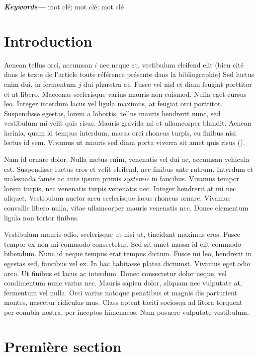 \documentclass[a4paper]{article}
\providecommand{\keywords}[1]
{
  \small	
  \textbf{\textit{Keywords---}} #1
}
\begin{document}
\keywords{mot clé; mot clé; mot clé}

\clearpage

\section{Introduction}

Aenean tellus orci, accumsan $i$ nec neque at, vestibulum eleifend elit \cite{helbing09,SchadCA09} ({\color{blue}bien cité dans le texte de l'article toute référence présente dans la bibliographie}) Sed luctus enim dui, in fermentum $j$ dui pharetra at. Fusce vel nisl et diam feugiat porttitor et at libero. Maecenas scelerisque varius mauris non euismod. Nulla eget cursus leo. Integer interdum lacus vel ligula maximus, at feugiat orci porttitor. Suspendisse egestas, lorem a  lobortis, tellus mauris hendrerit nunc, sed vestibulum mi velit quis risus. Mauris gravida mi et ullamcorper blandit. Aenean lacinia, quam id tempus interdum, massa orci rhoncus turpis, eu finibus nisi lectus id sem. Vivamus ut mauris sed diam porta viverra sit amet quis risus (\cite{Zuriguel09}).

Nam id ornare dolor. Nulla metus enim, venenatis vel dui ac, accumsan vehicula est. Suspendisse luctus eros et velit eleifend, nec finibus ante rutrum. Interdum et malesuada fames ac ante ipsum primis  {\em systemic} in faucibus. Vivamus tempor lorem turpis, nec venenatis turpis venenatis nec. Integer hendrerit at mi nec aliquet. Vestibulum auctor arcu scelerisque lacus rhoncus ornare. Vivamus convallis libero nulla, vitae ullamcorper mauris venenatis nec. Donec elementum ligula non tortor  finibus.

Vestibulum mauris odio, scelerisque ut nisi ut, tincidunt maximus eros. Fusce tempor ex non mi commodo consectetur. Sed sit amet massa id elit commodo bibendum. Nunc id neque tempus erat tempus dictum. Fusce mi leo, hendrerit in egestas sed, faucibus vel ex. In hac habitasse platea dictumst. Vivamus eget odio arcu. Ut finibus et lacus ac interdum. Donec consectetur dolor neque, vel condimentum nunc varius nec. Mauris sapien dolor, aliquam nec vulputate at, fermentum vel nulla. Orci varius natoque penatibus et magnis dis parturient montes, nascetur ridiculus mus. Class aptent taciti sociosqu ad litora torquent per conubia nostra, per inceptos himenaeos. Nam posuere vulputate vestibulum.

\section{Première section}
\end{document}
